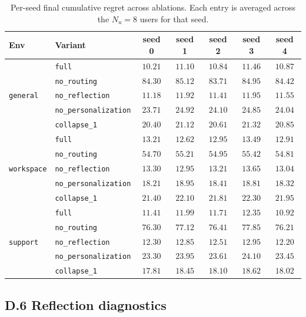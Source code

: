 \documentclass{article} %
\begin{document}
\begin{table}[h]
\centering
\small
\begin{tabular}{llccccc}
\toprule
Env & Variant & seed 0 & seed 1 & seed 2 & seed 3 & seed 4 \\
\midrule
\multirow{5}{*}{\texttt{general}}
 & \texttt{full}                & $10.21$ & $11.10$ & $10.84$ & $11.46$ & $10.87$ \\
 & \texttt{no\_routing}         & $84.30$ & $85.12$ & $83.71$ & $84.95$ & $84.42$ \\
 & \texttt{no\_reflection}      & $11.18$ & $11.92$ & $11.41$ & $11.95$ & $11.55$ \\
 & \texttt{no\_personalization} & $23.71$ & $24.92$ & $24.10$ & $24.85$ & $24.04$ \\
 & \texttt{collapse\_1}         & $20.40$ & $21.12$ & $20.61$ & $21.32$ & $20.85$ \\
\midrule
\multirow{5}{*}{\texttt{workspace}}
 & \texttt{full}                & $13.21$ & $12.62$ & $12.95$ & $13.49$ & $12.91$ \\
 & \texttt{no\_routing}         & $54.70$ & $55.21$ & $54.95$ & $55.42$ & $54.81$ \\
 & \texttt{no\_reflection}      & $13.30$ & $12.95$ & $13.21$ & $13.65$ & $13.04$ \\
 & \texttt{no\_personalization} & $18.21$ & $18.95$ & $18.41$ & $18.81$ & $18.32$ \\
 & \texttt{collapse\_1}         & $21.40$ & $22.10$ & $21.81$ & $22.30$ & $21.95$ \\
\midrule
\multirow{5}{*}{\texttt{support}}
 & \texttt{full}                & $11.41$ & $11.99$ & $11.71$ & $12.35$ & $10.92$ \\
 & \texttt{no\_routing}         & $76.30$ & $77.12$ & $76.41$ & $77.85$ & $76.21$ \\
 & \texttt{no\_reflection}      & $12.30$ & $12.85$ & $12.51$ & $12.95$ & $12.20$ \\
 & \texttt{no\_personalization} & $23.30$ & $23.95$ & $23.61$ & $24.10$ & $23.45$ \\
 & \texttt{collapse\_1}         & $17.81$ & $18.45$ & $18.10$ & $18.62$ & $18.02$ \\
\bottomrule
\end{tabular}
\caption{Per-seed final cumulative regret across ablations. Each entry is averaged across the $N_u=8$ users for that seed.}
\label{tab:app-regret-abl}
\end{table}

\subsection{D.6 Reflection diagnostics}
\end{document}
